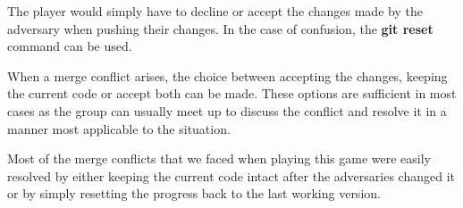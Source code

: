 \documentclass[twocolumn, 10pt]{article}
\begin{document}
The player would simply have to decline or accept the changes made by the adversary when pushing their changes. In the case of confusion, the \textbf{git reset} command can be used.

When a merge conflict arises, the choice between accepting the changes, keeping the current code or accept both can be made. These options are sufficient in most cases as the group can usually meet up to discuss the conflict and resolve it in a manner most applicable to the situation.

Most of the merge conflicts that we faced when playing this game were easily resolved by either keeping the current code intact after the adversaries changed it or by simply resetting the progress back to the last working version.
\end{document}

